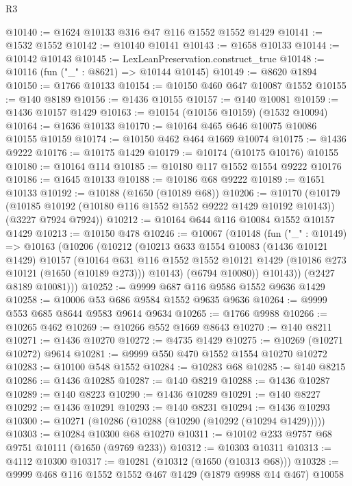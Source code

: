 \begin{lexlean}{R3}
\begin{coremodule}
@10140 := @1624 @10133 @316 @47 @116 @1552 @1552 @1429
@10141 := @1532 @1552
@10142 := @10140 @10141
@10143 := @1658 @10133
@10144 := @10142 @10143
@10145 := LexLeanPreservation.construct_true
@10148 := @10116 (fun ("_" : @8621) => @10144 @10145)
@10149 := @8620 @1894
@10150 := @1766 @10133
@10154 := @10150 @460 @647 @10087 @1552
@10155 := @140 @8189
@10156 := @1436 @10155
@10157 := @140 @10081
@10159 := @1436 @10157 @1429
@10163 := @10154 (@10156 @10159) (@1532 @10094)
@10164 := @1636 @10133
@10170 := @10164 @465 @646 @10075 @10086 @10155 @10159
@10174 := @10150 @462 @464 @1669 @10074
@10175 := @1436 @9222
@10176 := @10175 @1429
@10179 := @10174 (@10175 @10176) @10155
@10180 := @10164 @114
@10185 := @10180 @117 @1552 @1554 @9222 @10176
@10186 := @1645 @10133
@10188 := @10186 @68 @9222
@10189 := @1651 @10133
@10192 := @10188 (@1650 (@10189 @68))
@10206 := @10170
    (@10179 (@10185 @10192 (@10180 @116 @1552 @1552 @9222 @1429 @10192 @10143)) (@3227 @7924 @7924))
@10212 := @10164 @644 @116 @10084 @1552 @10157 @1429
@10213 := @10150 @478
@10246 := @10067
    (@10148
      (fun ("_" : @10149) =>
      @10163
        (@10206
          (@10212
            (@10213
              @633
              @1554
              @10083
              (@1436 @10121 @1429)
              @10157
              (@10164
                @631
                @116
                @1552
                @1552
                @10121
                @1429
                (@10186 @273 @10121 (@1650 (@10189 @273)))
                @10143)
              (@6794 @10080))
            @10143))
        (@2427 @8189 @10081)))
@10252 := @9999 @687 @116 @9586 @1552 @9636 @1429
@10258 := @10006 @53 @686 @9584 @1552 @9635 @9636
@10264 := @9999 @553 @685 @8644 @9583 @9614 @9634
@10265 := @1766 @9988
@10266 := @10265 @462
@10269 := @10266 @552 @1669 @8643
@10270 := @140 @8211
@10271 := @1436 @10270
@10272 := @4735 @1429
@10275 := @10269 (@10271 @10272) @9614
@10281 := @9999 @550 @470 @1552 @1554 @10270 @10272
@10283 := @10100 @548 @1552
@10284 := @10283 @68
@10285 := @140 @8215
@10286 := @1436 @10285
@10287 := @140 @8219
@10288 := @1436 @10287
@10289 := @140 @8223
@10290 := @1436 @10289
@10291 := @140 @8227
@10292 := @1436 @10291
@10293 := @140 @8231
@10294 := @1436 @10293
@10300 := @10271 (@10286 (@10288 (@10290 (@10292 (@10294 @1429)))))
@10303 := @10284 @10300 @68 @10270
@10311 := @10102 @233 @9757 @68 @9751 @10111 (@1650 (@9769 @233))
@10312 := @10303 @10311
@10313 := @4112 @10300
@10317 := @10281 (@10312 (@1650 (@10313 @68)))
@10328 := @9999 @468 @116 @1552 @1552 @467 @1429 (@1879 @9988 @14 @467) @10058

\end{coremodule}
\end{lexlean}
